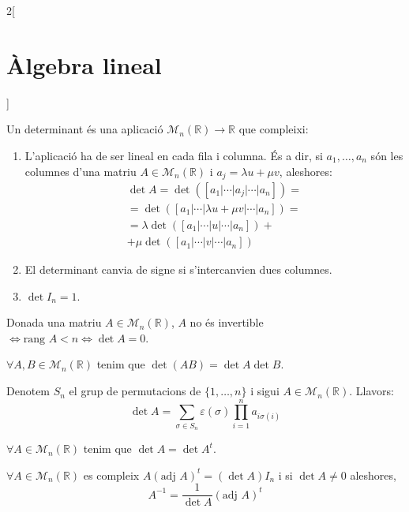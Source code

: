 \documentclass[class=article,10pt,crop=false]{standalone}
\begin{document}
\begin{multicols}{2}[\section{Àlgebra lineal}]
\begin{theorem}
\end{theorem}
\begin{definition}
Un determinant és una aplicació $\mathcal{M}_n(\mathbb{R})\rightarrow\mathbb{R}$ que compleixi:
\begin{enumerate}
    \item L'aplicació ha de ser lineal en cada fila i columna. És a dir, si $a_1,\ldots,a_n$ són les columnes d'una matriu $A\in\mathcal{M}_n(\mathbb{R})$ i $a_j=\lambda u+\mu v$, aleshores:
    \begin{multline*}
        \det A=\det([a_1|\cdots|a_j|\cdots| a_n])=\\=\det([a_1|\cdots|\lambda u+\mu v|\cdots| a_n])=\\=\lambda\det([a_1|\cdots| u|\cdots| a_n])+\\+\mu\det([a_1|\cdots| v|\cdots| a_n])
    \end{multline*}
    \item El determinant canvia de signe si s'intercanvien dues columnes.
    \item $\det I_n=1$.
\end{enumerate}
\end{definition}
\begin{prop}
Donada una matriu $A\in\mathcal{M}_n(\mathbb{R})$, $A$ no és invertible $\iff\text{rang }A<n\iff\det A=0$.
\end{prop}
\begin{theorem}
$\forall A,B\in\mathcal{M}_n(\mathbb{R})$ tenim que $\det (AB)=\det A\det B$.
\end{theorem}
\begin{prop}
Denotem $S_n$ el grup de permutacions de $\{1,\ldots,n\}$ i sigui $A\in\mathcal{M}_n(\mathbb{R})$. Llavors: $$\det A=\sum_{\sigma\in S_n}\varepsilon(\sigma)\prod_{i=1}^na_{i\sigma(i)}$$
\end{prop}
\begin{prop}
$\forall A\in\mathcal{M}_n(\mathbb{R})$ tenim que $\det A=\det A^t$.
\end{prop}
\begin{theorem}
$\forall A\in\mathcal{M}_n(\mathbb{R})$ es compleix $A(\text{adj }A)^t=(\det A)I_n$ i si $\det A\ne 0$ aleshores, $$A^{-1}=\frac{1}{\det A}(\text{adj }A)^t$$
\end{theorem}

\end{multicols}
\end{document}
